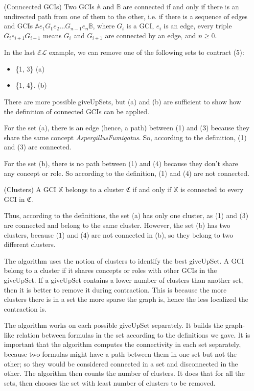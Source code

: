 \begin{defn}(Conncected GCIs)
Two GCIs $\mathbb{A}$ and $\mathbb{B}$ are connected if and only if there is an undirected path from one of them to the other, i.e. if there is a sequence of edges and GCIs $\mathbb{A}e_1G_1e_2 ... G_{n-1}e_n\mathbb{B}$, where $G_i$ is a GCI, $e_i$ is an edge, every triple $G_ie_{i+1}G_{i+1}$ means $G_i$ and $G_{i+1}$ are connected by an edge, and $n \geq 0$.
\end{defn}

In the last $\mathcal{EL}$ example, we can remove one of the following sets to contract (5):
\begin{itemize}
\item \{1, 3\} (a)
\item \{1, 4\}. (b)
\end{itemize}

There are more possible giveUpSets, but (a) and (b) are sufficient to show how the definition of connected GCIs can be applied. 

For the set (a), there is an edge (hence, a path) between (1) and (3) because they share the same concept \textit{AspergillusFumigatus}. So, according to the definition, (1) and (3) are connected.

For the set (b), there is no path between (1) and (4) because they don't share any concept or role. So according to the definition, (1) and (4) are not connected.

\begin{defn}(Clusters)
A GCI $\mathbb{X}$ belongs to a cluster $\mathfrak{C}$ if and only if $\mathbb{X}$ is connected to every GCI in $\mathfrak{C}$.
\end{defn}

Thus, according to the definitions, the set (a) has only one cluster, as (1) and (3) are connected and belong to the same cluster. However, the set (b) has two clusters, because (1) and (4) are not connected in (b), so they belong to two different clusters.

The algorithm uses the notion of clusters to identify the best giveUpSet. A GCI belong to a cluster if it shares concepts or roles with other GCIs in the giveUpSet. If a giveUpSet contains a lower number of clusters than another set, then it is better to remove it during contraction. This is because the more clusters there is in a set the more sparse the graph is, hence the less localized the contraction is. 

The algorithm works on each possible giveUpSet separately. It builds the graph-like relation between formulas in the set according to the definitions we gave. It is important that the algorithm computes the connectivity in each set separately, because two formulas might have a path between them in one set but not the other; so they would be considered connected in a set and disconnected in the other. The algorithm then counts the number of clusters. It does that for all the sets, then chooses the set with least number of clusters to be removed.


